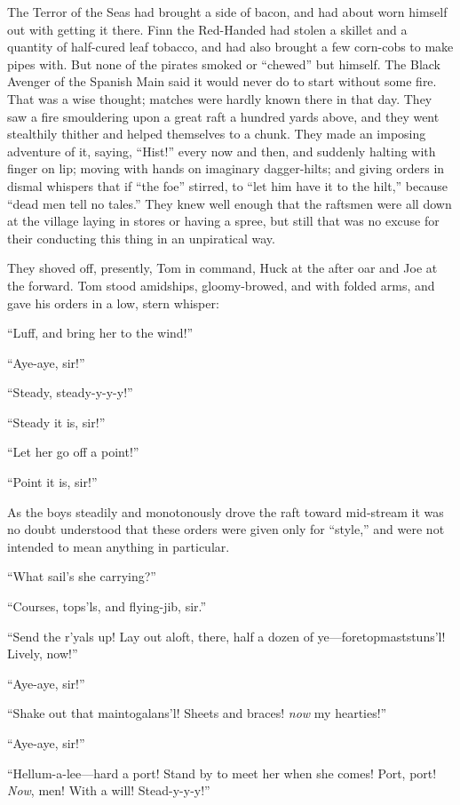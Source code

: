 \documentclass{book}
\begin{document}
The Terror of the Seas had brought a side of bacon, and had about worn himself out with getting it there. Finn the Red-Handed had stolen a skillet and a quantity of half-cured leaf tobacco, and had also brought a few corn-cobs to make pipes with. But none of the pirates smoked or “chewed” but himself. The Black Avenger of the Spanish Main said it would never do to start without some fire. That was a wise thought; matches were hardly known there in that day. They saw a fire smouldering upon a great raft a hundred yards above, and they went stealthily thither and helped themselves to a chunk. They made an imposing adventure of it, saying, “Hist!” every now and then, and suddenly halting with finger on lip; moving with hands on imaginary dagger-hilts; and giving orders in dismal whispers that if “the foe” stirred, to “let him have it to the hilt,” because “dead men tell no tales.” They knew well enough that the raftsmen were all down at the village laying in stores or having a spree, but still that was no excuse for their conducting this thing in an unpiratical way.

They shoved off, presently, Tom in command, Huck at the after oar and Joe at the forward. Tom stood amidships, gloomy-browed, and with folded arms, and gave his orders in a low, stern whisper:

“Luff, and bring her to the wind!”

“Aye-aye, sir!”

“Steady, steady-y-y-y!”

“Steady it is, sir!”

“Let her go off a point!”

“Point it is, sir!”

As the boys steadily and monotonously drove the raft toward mid-stream it was no doubt understood that these orders were given only for “style,” and were not intended to mean anything in particular.

“What sail’s she carrying?”

“Courses, tops’ls, and flying-jib, sir.”

“Send the r’yals up! Lay out aloft, there, half a dozen of ye—foretopmaststuns’l! Lively, now!”

“Aye-aye, sir!”

“Shake out that maintogalans’l! Sheets and braces! \emph{now} my hearties!”

“Aye-aye, sir!”

“Hellum-a-lee—hard a port! Stand by to meet her when she comes! Port, port! \emph{Now}, men! With a will! Stead-y-y-y!”
\end{document}
